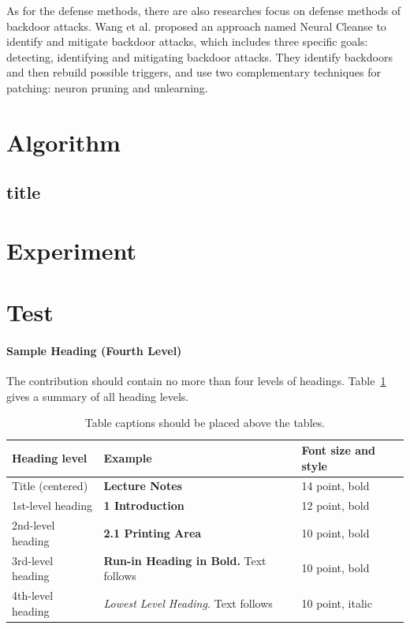 \documentclass[runningheads]{llncs}
\begin{document}
As for the defense methods, there are also researches focus on defense methods of backdoor attacks. Wang et al. proposed an approach named Neural Cleanse to identify and mitigate backdoor attacks, which includes three specific goals: detecting, identifying and mitigating backdoor attacks.\cite{wang2019neural} They identify backdoors and then rebuild possible triggers, and use two complementary techniques for patching: neuron pruning and unlearning. 

\section{Algorithm}

\subsection{title}

\section{Experiment}





\section{Test}
\paragraph{Sample Heading (Fourth Level)}
The contribution should contain no more than four levels of
headings. Table~\ref{tab1} gives a summary of all heading levels.

\begin{table}
\caption{Table captions should be placed above the
tables.}\label{tab1}
\begin{tabular}{|l|l|l|}
\hline
Heading level &  Example & Font size and style\\
\hline
Title (centered) &  {\Large\bfseries Lecture Notes} & 14 point, bold\\
1st-level heading &  {\large\bfseries 1 Introduction} & 12 point, bold\\
2nd-level heading & {\bfseries 2.1 Printing Area} & 10 point, bold\\
3rd-level heading & {\bfseries Run-in Heading in Bold.} Text follows & 10 point, bold\\
4th-level heading & {\itshape Lowest Level Heading.} Text follows & 10 point, italic\\
\hline
\end{tabular}
\end{table}
\end{document}
